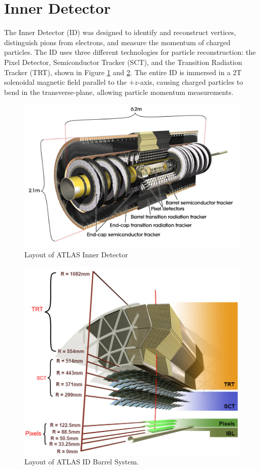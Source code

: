 \section{Inner Detector}
The Inner Detector (ID) was designed to identify and reconstruct vertices, distinguish pions from electrons, and measure the momentum of charged particles. The ID uses three different technologies for particle reconstruction: the Pixel Detector, Semiconductor Tracker (SCT), and the Transition Radiation Tracker (TRT), shown in Figure \ref{fig:ID} and \ref{fig:barrelID}. The entire ID is immersed in a 2T solenoidal magnetic field parallel to the $+z$-axis, causing charged particles to bend in the transverse-plane, allowing particle momentum measurements. 

\begin{figure}[h!]
  \centering
  \includegraphics[width=\hsize]{figures/Detector/tracker_layout.jpg}
  \caption{Layout of ATLAS Inner Detector} 
  \label{fig:ID}
\end{figure}
\FloatBarrier


\begin{figure}[h!]
  \centering
  \includegraphics[width=\hsize]{figures/Detector/tracker_barrel.png}
  \caption{Layout of ATLAS ID Barrel System.} 
  \label{fig:barrelID}
\end{figure}
\FloatBarrier



